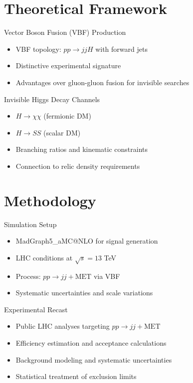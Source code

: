 \documentclass{../../bredelebeamer}
\begin{document}
\section{Theoretical Framework}
\begin{frame}{Vector Boson Fusion (VBF) Production}
    \begin{itemize}
        \item VBF topology: $pp \to jj H$ with forward jets
        \item Distinctive experimental signature
        \item Advantages over gluon-gluon fusion for invisible searches
    \end{itemize}
\end{frame}

\begin{frame}{Invisible Higgs Decay Channels}
    \begin{itemize}
        \item $H \to \chi \chi$ (fermionic DM)
        \item $H \to SS$ (scalar DM)
        \item Branching ratios and kinematic constraints
        \item Connection to relic density requirements
    \end{itemize}
\end{frame}

\section{Methodology}
\begin{frame}{Simulation Setup}
    \begin{itemize}
        \item MadGraph5\_aMC@NLO for signal generation
        \item LHC conditions at $\sqrt{s} = 13$ TeV
        \item Process: $pp \to jj + \text{MET}$ via VBF
        \item Systematic uncertainties and scale variations
    \end{itemize}
\end{frame}

\begin{frame}{Experimental Recast}
    \begin{itemize}
        \item Public LHC analyses targeting $pp \to jj + \text{MET}$
        \item Efficiency estimation and acceptance calculations
        \item Background modeling and systematic uncertainties
        \item Statistical treatment of exclusion limits
    \end{itemize}
\end{frame}
\end{document}
